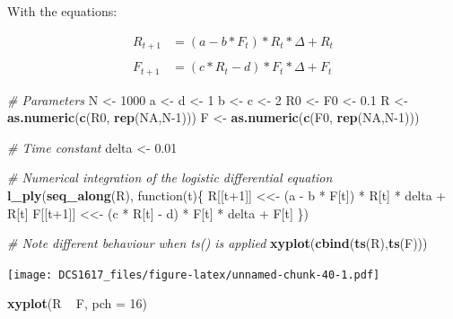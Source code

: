 \documentclass[]{book}
\newenvironment{Shaded}{\begin{snugshade}}{\end{snugshade}}
\newcommand{\KeywordTok}[1]{\textcolor[rgb]{0.13,0.29,0.53}{\textbf{{#1}}}}
\newcommand{\DataTypeTok}[1]{\textcolor[rgb]{0.13,0.29,0.53}{{#1}}}
\newcommand{\DecValTok}[1]{\textcolor[rgb]{0.00,0.00,0.81}{{#1}}}
\newcommand{\FloatTok}[1]{\textcolor[rgb]{0.00,0.00,0.81}{{#1}}}
\newcommand{\StringTok}[1]{\textcolor[rgb]{0.31,0.60,0.02}{{#1}}}
\newcommand{\CommentTok}[1]{\textcolor[rgb]{0.56,0.35,0.01}{\textit{{#1}}}}
\newcommand{\OtherTok}[1]{\textcolor[rgb]{0.56,0.35,0.01}{{#1}}}
\newcommand{\NormalTok}[1]{{#1}}
\begin{document}
With the equations:

\begin{align}
R_{t+1} &=  (a-b*F_t)*R_t * \Delta + R_t \\
\\
F_{t+1} &=  (c*R_t-d)*F_t * \Delta + F_t
\end{align}

\begin{Shaded}
\begin{Highlighting}[]
\CommentTok{# Parameters}
\NormalTok{N  <-}\StringTok{ }\DecValTok{1000}
\NormalTok{a  <-}\StringTok{ }\NormalTok{d <-}\StringTok{ }\DecValTok{1}
\NormalTok{b  <-}\StringTok{ }\NormalTok{c <-}\StringTok{ }\DecValTok{2} 
\NormalTok{R0 <-}\StringTok{ }\NormalTok{F0 <-}\StringTok{ }\FloatTok{0.1}
\NormalTok{R  <-}\StringTok{ }\KeywordTok{as.numeric}\NormalTok{(}\KeywordTok{c}\NormalTok{(R0, }\KeywordTok{rep}\NormalTok{(}\OtherTok{NA}\NormalTok{,N}\DecValTok{-1}\NormalTok{)))}
\NormalTok{F  <-}\StringTok{ }\KeywordTok{as.numeric}\NormalTok{(}\KeywordTok{c}\NormalTok{(F0, }\KeywordTok{rep}\NormalTok{(}\OtherTok{NA}\NormalTok{,N}\DecValTok{-1}\NormalTok{)))}

\CommentTok{# Time constant}
\NormalTok{delta <-}\StringTok{ }\FloatTok{0.01}

\CommentTok{# Numerical integration of the logistic differential equation}
\KeywordTok{l_ply}\NormalTok{(}\KeywordTok{seq_along}\NormalTok{(R), function(t)\{}
    \NormalTok{R[[t}\DecValTok{+1}\NormalTok{]] <<-}\StringTok{ }\NormalTok{(a -}\StringTok{ }\NormalTok{b *}\StringTok{ }\NormalTok{F[t]) *}\StringTok{ }\NormalTok{R[t] *}\StringTok{ }\NormalTok{delta +}\StringTok{ }\NormalTok{R[t] }
    \NormalTok{F[[t}\DecValTok{+1}\NormalTok{]] <<-}\StringTok{ }\NormalTok{(c *}\StringTok{ }\NormalTok{R[t] -}\StringTok{ }\NormalTok{d) *}\StringTok{ }\NormalTok{F[t] *}\StringTok{ }\NormalTok{delta +}\StringTok{ }\NormalTok{F[t] }
    \NormalTok{\})}

\CommentTok{# Note different behaviour when ts() is applied}
\KeywordTok{xyplot}\NormalTok{(}\KeywordTok{cbind}\NormalTok{(}\KeywordTok{ts}\NormalTok{(R),}\KeywordTok{ts}\NormalTok{(F)))}
\end{Highlighting}
\end{Shaded}

\texttt{[image: DCS1617\_files/figure-latex/unnamed-chunk-40-1.pdf]}

\begin{Shaded}
\begin{Highlighting}[]
\KeywordTok{xyplot}\NormalTok{(R ~}\StringTok{ }\NormalTok{F, }\DataTypeTok{pch =} \DecValTok{16}\NormalTok{)}
\end{Highlighting}
\end{Shaded}
\end{document}
